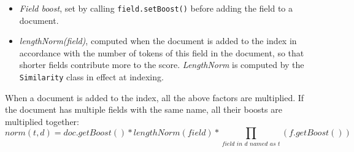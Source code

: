 \begin{itemize}
\begin{itemize}
            \item \emph{Field boost}, set by calling \verb|field.setBoost()|
            before adding the field to a document. 
            \item \emph{lengthNorm(field)}, computed when the document is added
            to the index in accordance with the number of tokens of this field
            in the document, so that shorter fields contribute more to the score. 
            \emph{LengthNorm} is computed by the \verb|Similarity| class in
            effect at indexing.
          \end{itemize}
   When a document is added to the index, all the above factors are
   multiplied. If the document has multiple fields with the same name, all
   their boosts are multiplied together: \[
  norm(t,d)= doc.getBoost() * 
  lengthNorm(field) * \prod_{field\phantom{i}in\phantom{i}
  d\phantom{i}named\phantom{i}as\phantom{i}t}(f.getBoost()) \]
\end{itemize}



